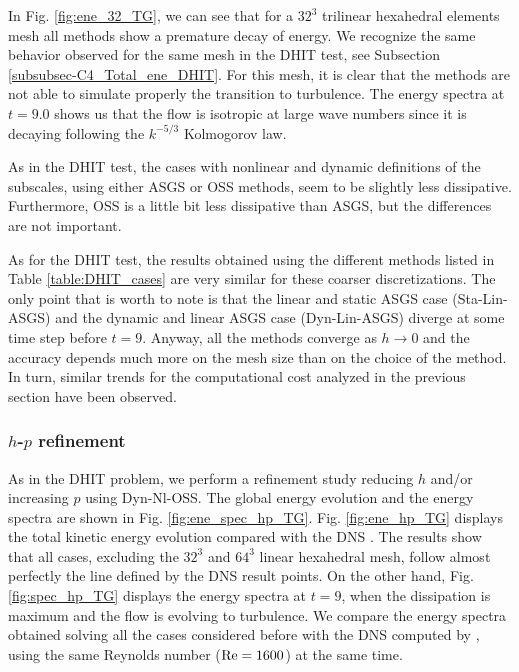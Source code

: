 
In Fig. \ref{fig:ene_32_TG}, we can see that for a $32^3$ trilinear hexahedral elements mesh all methods show a premature decay of energy. We recognize the same behavior observed for the same mesh in the DHIT test, see Subsection \ref{subsubsec-C4_Total_ene_DHIT}. For this mesh, it is clear that the methods are not able to simulate properly the transition to turbulence. The energy spectra at $t=9.0$ shows us that the flow is isotropic at large wave numbers since it is decaying following the $k^{-5/3}$ Kolmogorov law. 

As in the DHIT test, the cases with nonlinear and dynamic definitions of the subscales, using either ASGS or OSS methods, seem to be slightly less dissipative. Furthermore, OSS is a little bit less dissipative than ASGS, but the differences are not important. 

As for the DHIT test, the results obtained using the different methods listed in Table \ref{table:DHIT_cases} are very similar for these coarser discretizations. The only point that is worth to note is that the linear and static ASGS case (Sta-Lin-ASGS) and the dynamic and linear ASGS case (Dyn-Lin-ASGS) diverge at some time step before $t=9$. Anyway, all the methods converge as $h\rightarrow0$ and the accuracy depends much more on the mesh size than on the choice of the method. In turn, similar trends for the computational cost analyzed in the previous section have been observed.

\subsubsection{$h$-$p$ refinement}

As in the DHIT problem, we perform a refinement study reducing $h$ and/or increasing $p$ using  Dyn-Nl-OSS. 
The global energy evolution and the energy spectra are shown in Fig. \ref{fig:ene_spec_hp_TG}. Fig. \ref{fig:ene_hp_TG} displays the total kinetic energy evolution compared with the DNS \cite{brachet_small-scale_1983}. The results show that all cases, excluding the $32^3$ and $64^3$ linear hexahedral mesh, follow almost perfectly the line defined by the DNS result points. On the other hand, Fig. \ref{fig:spec_hp_TG} displays the energy spectra at $t=9$, when the dissipation is maximum and the flow is evolving to turbulence. We compare the energy spectra obtained solving all the cases considered before with the DNS computed by \cite{gassner_accuracy_????}, using the same Reynolds number (${\rm Re}=1600$) at the same time. 

